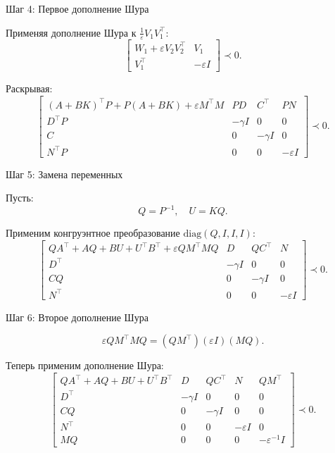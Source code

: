 \documentclass{beamer}
\begin{document}
\begin{frame}{Шаг 4: Первое дополнение Шура}
	\begin{flushleft}
		
		Применяя дополнение Шура к $\frac{1}{\varepsilon} V_1 V_1^\top$:
		\[
		\begin{bmatrix}
			W_1 + \varepsilon V_2 V_2^\top & V_1 \\
			V_1^\top & -\varepsilon I
		\end{bmatrix}
		\prec 0.
		\]
		
		Раскрывая:
		\[
		\begin{bmatrix}
			(A + BK)^\top P + P(A + BK) + \varepsilon M^\top M & PD & C^\top & PN \\
			D^\top P & -\gamma I & 0 & 0 \\
			C & 0 & -\gamma I & 0 \\
			N^\top P & 0 & 0 & -\varepsilon I
		\end{bmatrix}
		\prec 0.
		\]
		
	\end{flushleft}
\end{frame}


\begin{frame}{Шаг 5: Замена переменных}
	\begin{flushleft}
		
		Пусть:
		\[
		Q = P^{-1}, \quad U = KQ.
		\]
		
		Применим конгруэнтное преобразование $\mathrm{diag}(Q, I, I, I)$:
		\[
		\begin{bmatrix}
			QA^\top + AQ + BU + U^\top B^\top + \varepsilon Q M^\top M Q
			& D & QC^\top & N \\
			D^\top & -\gamma I & 0 & 0 \\
			CQ & 0 & -\gamma I & 0 \\
			N^\top & 0 & 0 & -\varepsilon I
		\end{bmatrix}
		\prec 0.
		\]
		
		
	\end{flushleft}
\end{frame}



\begin{frame}{Шаг 6: Второе дополнение Шура}
	\begin{flushleft}
		
		\[
		\varepsilon Q M^\top M Q
		=
		(Q M^\top)(\varepsilon I)(M Q).
		\]
		
		Теперь применим дополнение Шура:
		\[
		\begin{bmatrix}
			QA^\top + AQ + BU + U^\top B^\top
			& D
			& QC^\top
			& N
			& Q M^\top \\
			D^\top
			& -\gamma I
			& 0
			& 0
			& 0 \\
			CQ
			& 0
			& -\gamma I
			& 0
			& 0 \\
			N^\top
			& 0
			& 0
			& -\varepsilon I
			& 0 \\
			M Q
			& 0
			& 0
			& 0
			& -\varepsilon^{-1} I
		\end{bmatrix}
		\prec 0.
		\]
		
	\end{flushleft}
\end{frame}
\end{document}
